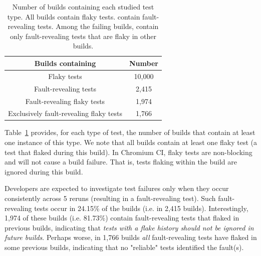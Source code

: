 \begin{table}[ht]
\caption{Number of builds containing each studied test type. All builds contain flaky tests.  contain fault-revealing tests. Among the failing builds,  contain only fault-revealing tests that are flaky in other builds.}
\label{table:DiscBuilds}
\centering
\begin{tabular}{c|c} 
 \toprule
 \textbf{Builds containing} & \textbf{Number} \\ [0.5ex] 
 \midrule
 Flaky tests & 10,000 \\ 
 Fault-revealing tests & 2,415 \\ 
 Fault-revealing flaky tests & 1,974 \\ 
 Exclusively fault-revealing flaky tests & 1,766 \\ 
 \bottomrule
\end{tabular}
\vspace{-1em}
\end{table}

Table~\ref{table:DiscBuilds} provides, for each type of test, the number of builds that contain at least one instance of this type. We note that all builds contain at least one flaky test (a test that flaked during this build). In Chromium CI, flaky tests are non-blocking and will not cause a build failure. That is, tests flaking within the build are ignored during this build. 

Developers are expected to investigate test failures only when they occur consistently across 5 reruns (resulting in a fault-revealing test). Such fault-revealing tests occur in 24.15\% of the builds (i.e. in 2,415 builds). Interestingly, 1,974 of these builds (i.e. 81.73\%) contain fault-revealing tests that flaked in previous builds, indicating that \emph{tests with a flake history should not be ignored in future builds}. Perhaps worse, in 1,766 builds \emph{all} fault-revealing tests have flaked in some previous builds, indicating that no "reliable" tests identified the fault(s).

